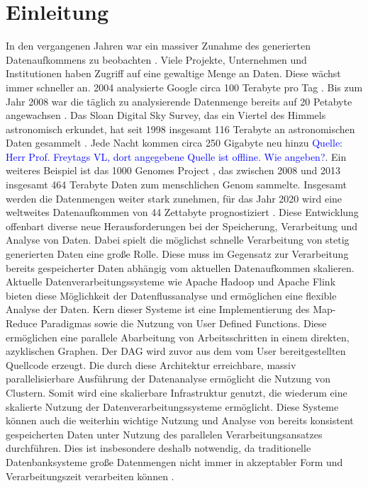 \chapter{Einleitung}
In den vergangenen Jahren war ein massiver Zunahme des generierten Datenaufkommens zu beobachten \cite{EMC2014}. Viele Projekte, Unternehmen und Institutionen haben Zugriff auf eine gewaltige Menge an Daten. Diese wächst immer schneller an. 2004 analysierte Google circa 100 Terabyte pro Tag \cite{Dean2004}. Bis zum Jahr 2008 war die täglich zu analysierende Datenmenge bereits auf 20 Petabyte angewachsen \cite{Dean2008}. Das Sloan Digital Sky Survey, das ein Viertel des Himmels astronomisch erkundet, hat seit 1998 insgesamt 116 Terabyte an astronomischen Daten gesammelt \cite{York2000, Alam2015}. Jede Nacht kommen circa 250 Gigabyte neu hinzu \textcolor{blue}{Quelle: Herr Prof. Freytags VL, dort angegebene Quelle ist offline. Wie angeben?}. Ein weiteres Beispiel ist das 1000 Genomes Project \cite{Baker2010}, das zwischen 2008 und 2013 insgesamt 464 Terabyte Daten zum menschlichen Genom sammelte. Insgesamt werden die Datenmengen weiter stark zunehmen, für das Jahr 2020 wird eine weltweites Datenaufkommen von 44 Zettabyte prognostiziert \cite{EMC2014}. 
Diese Entwicklung offenbart diverse neue Herausforderungen bei der Speicherung, Verarbeitung und Analyse von Daten. Dabei spielt die möglichst schnelle Verarbeitung von stetig generierten Daten eine große Rolle. Diese muss im Gegensatz zur Verarbeitung bereits gespeicherter Daten abhängig vom aktuellen Datenaufkommen skalieren. Aktuelle Datenverarbeitungssysteme wie Apache Hadoop \cite{HadoopWebsite} und Apache Flink \cite{FlinkWebsite} bieten diese Möglichkeit der Datenflussanalyse und ermöglichen eine flexible Analyse der Daten. Kern dieser Systeme ist eine Implementierung des Map-Reduce Paradigmas \cite{Dean2008} sowie die Nutzung von User Defined Functions. Diese ermöglichen eine parallele Abarbeitung von Arbeitsschritten in einem direkten, azyklischen Graphen. Der DAG wird zuvor aus dem vom User bereitgestellten Quellcode erzeugt. Die durch diese Architektur erreichbare, massiv parallelisierbare Ausführung der Datenanalyse ermöglicht die Nutzung von Clustern. Somit wird eine skalierbare Infrastruktur genutzt, die wiederum eine skalierte Nutzung der Datenverarbeitungssysteme ermöglicht. Diese Systeme können auch die weiterhin wichtige Nutzung und Analyse von bereits konsistent gespeicherten Daten unter Nutzung des parallelen Verarbeitungsansatzes durchführen. Dies ist insbesondere deshalb notwendig, da traditionelle Datenbanksysteme große Datenmengen nicht immer in akzeptabler Form und Verarbeitungszeit verarbeiten können \cite{Jacobs2009}.
